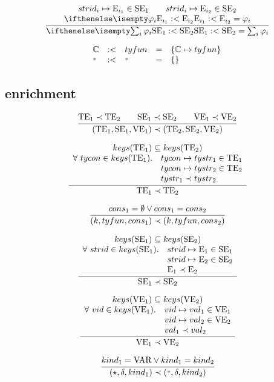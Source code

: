 \documentclass[11pt,a4paper]{article}
\newcommand{\E}  {\textrm{E}}
\newcommand{\TE} {\textrm{TE}}
\newcommand{\VE} {\textrm{VE}}
\newcommand{\SE} {\textrm{SE}}
\newcommand{\tycon}{\mathbb{C}}
\newcommand{\VKV}  {\textrm{VAR}}
\newcommand{\braced}[1]{\{#1\}}
\newcommand{\KEYS}[1]{keys(#1)}
\newcommand{\TYNAMES}[1]{\KEYS{#1}}
\newcommand{\wildcard}{{\color{gray}\scriptstyle\textbf{*}}}
\newcommand{\Empty}{\braced{}}
\newcommand{\absval}{\star}
\begin{document}
\[
\cfrac
 {\begin{array}{c}
  strid_i \mapsto \E_{i_1} \in \SE_1 \qquad strid_i \mapsto \E_{i_2} \in \SE_2 \\
  \instE[\varphi_i]{\E_{i_1}}{\E_{i_2}}
  \end{array}}
 {\instE[\sum_i\varphi_i]{\SE_1}{\SE_2}}
\]

\[
\begin{array}{lclcl}
{\tycon}    & \instEop & {tyfun}     & = & \braced{\tycon \mapsto tyfun} \\
{\wildcard} & \instEop & {\wildcard} & = & \Empty \\
\end{array}
\]

\subsection{enrichment}
\[
\cfrac
 {\enrichE{\TE_1}{\TE_2} \qquad \enrichE{\SE_1}{\SE_2} \qquad \enrichE{\VE_1}{\VE_2}}
 {\enrichE{(\TE_1,\SE_1,\VE_1)}{(\TE_2,\SE_2,\VE_2)}}
\]

\[
\cfrac
 {\begin{array}{cl}
  \multicolumn{2}{c}{\TYNAMES{\TE_1}\subseteq\TYNAMES{\TE_2}}   \\
  \forall\ tycon \in \TYNAMES{\TE_1}. 
    & tycon \mapsto tystr_1 \in \TE_1    \\
    & tycon \mapsto tystr_2 \in \TE_2    \\
    & \enrichE{tystr_1}{tystr_2}
  \end{array}}
 {\enrichE{\TE_1}{\TE_2}}
\]

\[
\cfrac
 {cons_1 = \emptyset \vee cons_1 = cons_2}
 {(k, tyfun, cons_1) \prec (k, tyfun, cons_2)}
\]

\[
\cfrac
 {\begin{array}{cl}
  \multicolumn{2}{c}{\KEYS{\SE_1} \subseteq \KEYS{\SE_2}}   \\
  \forall\ strid \in \KEYS{\SE_1}. 
    & strid \mapsto \E_1 \in \SE_1 \\
    & strid \mapsto \E_2 \in \SE_2 \\
    & \enrichE{\E_1}{\E_2}
  \end{array}}
 {\enrichE{\SE_1}{\SE_2}}
\]

\[
\cfrac
 {\begin{array}{cl}
  \multicolumn{2}{c}{\KEYS{\VE_1} \subseteq \KEYS{\VE_2}}   \\
  \forall\ vid \in \KEYS{\VE_1}. 
    & vid \mapsto val_1 \in \VE_1 \\
    & vid \mapsto val_2 \in \VE_2 \\
    & \enrichE{val_1}{val_2}
  \end{array}}
 {\enrichE{\VE_1}{\VE_2}}
\]

\[
\cfrac
 {kind_1 = \VKV \vee kind_1 = kind_2}
 {\enrichE{(\absval,\delta,kind_1)}{(\wildcard, \delta, kind_2)}}
\]
\end{document}
